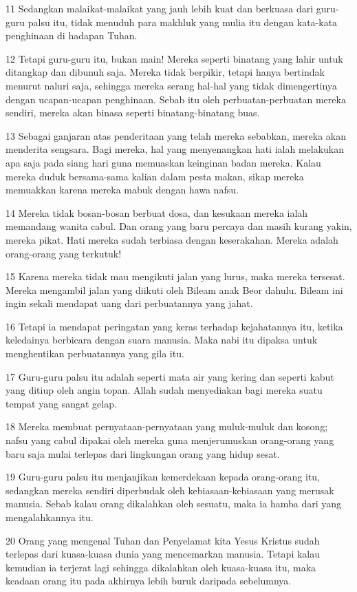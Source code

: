\par 11 Sedangkan malaikat-malaikat yang jauh lebih kuat dan berkuasa dari guru-guru palsu itu, tidak menuduh para makhluk yang mulia itu dengan kata-kata penghinaan di hadapan Tuhan.
\par 12 Tetapi guru-guru itu, bukan main! Mereka seperti binatang yang lahir untuk ditangkap dan dibunuh saja. Mereka tidak berpikir, tetapi hanya bertindak menurut naluri saja, sehingga mereka serang hal-hal yang tidak dimengertinya dengan ucapan-ucapan penghinaan. Sebab itu oleh perbuatan-perbuatan mereka sendiri, mereka akan binasa seperti binatang-binatang buas.
\par 13 Sebagai ganjaran atas penderitaan yang telah mereka sebabkan, mereka akan menderita sengsara. Bagi mereka, hal yang menyenangkan hati ialah melakukan apa saja pada siang hari guna memuaskan keinginan badan mereka. Kalau mereka duduk bersama-sama kalian dalam pesta makan, sikap mereka memuakkan karena mereka mabuk dengan hawa nafsu.
\par 14 Mereka tidak bosan-bosan berbuat dosa, dan kesukaan mereka ialah memandang wanita cabul. Dan orang yang baru percaya dan masih kurang yakin, mereka pikat. Hati mereka sudah terbiasa dengan keserakahan. Mereka adalah orang-orang yang terkutuk!
\par 15 Karena mereka tidak mau mengikuti jalan yang lurus, maka mereka tersesat. Mereka mengambil jalan yang diikuti oleh Bileam anak Beor dahulu. Bileam ini ingin sekali mendapat uang dari perbuatannya yang jahat.
\par 16 Tetapi ia mendapat peringatan yang keras terhadap kejahatannya itu, ketika keledainya berbicara dengan suara manusia. Maka nabi itu dipaksa untuk menghentikan perbuatannya yang gila itu.
\par 17 Guru-guru palsu itu adalah seperti mata air yang kering dan seperti kabut yang ditiup oleh angin topan. Allah sudah menyediakan bagi mereka suatu tempat yang sangat gelap.
\par 18 Mereka membuat pernyataan-pernyataan yang muluk-muluk dan kosong; nafsu yang cabul dipakai oleh mereka guna menjerumuskan orang-orang yang baru saja mulai terlepas dari lingkungan orang yang hidup sesat.
\par 19 Guru-guru palsu itu menjanjikan kemerdekaan kepada orang-orang itu, sedangkan mereka sendiri diperbudak oleh kebiasaan-kebiasaan yang merusak manusia. Sebab kalau orang dikalahkan oleh sesuatu, maka ia hamba dari yang mengalahkannya itu.
\par 20 Orang yang mengenal Tuhan dan Penyelamat kita Yesus Kristus sudah terlepas dari kuasa-kuasa dunia yang mencemarkan manusia. Tetapi kalau kemudian ia terjerat lagi sehingga dikalahkan oleh kuasa-kuasa itu, maka keadaan orang itu pada akhirnya lebih buruk daripada sebelumnya.
